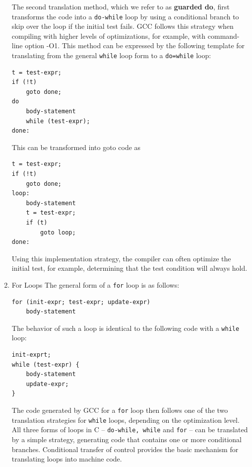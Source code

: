 \documentclass[11pt]{article}
\begin{document}
\begin{enumerate}
The second translation method, which we refer to as \textbf{guarded do}, first transforms the code into a \texttt{do-while} loop by using a conditional branch to skip over the loop if the initial test fails. GCC follows this strategy when compiling with higher levels of optimizations, for example, with command-line option -O1. This method can be expressed by the following template for translating from the general \texttt{while} loop form to a \texttt{do=while} loop:\\
\begin{verbatim}
t = test-expr;
if (!t)
    goto done;
do
    body-statement
    while (test-expr);
done:
\end{verbatim}

This can be transformed into goto code as\\
\begin{verbatim}
t = test-expr;
if (!t)
    goto done;
loop:
    body-statement
    t = test-expr;
    if (t)
        goto loop;
done:
\end{verbatim}

Using this implementation strategy, the compiler can often optimize the initial test, for example, determining that the test condition will always hold.\\

\item For Loops
\label{sec:org5500478}
The general form of a \texttt{for} loop is as follows:\\
\begin{verbatim}
for (init-expr; test-expr; update-expr)
    body-statement
\end{verbatim}

The behavior of such a loop is identical to the following code with a \texttt{while} loop:\\
\begin{verbatim}
init-exprt;
while (test-expr) {
    body-statement
    update-expr;
}
\end{verbatim}

The code generated by GCC for a \texttt{for} loop then follows one of the two translation strategies for \texttt{while} loops, depending on the optimization level.\\


All three forms of loops in C -- \texttt{do-while, while} and \texttt{for} -- can be translated by a simple strategy, generating code that contains one or more conditional branches. Conditional transfer of control provides the basic mechanism for translating loops into machine code.\\
\end{enumerate}
\end{document}
